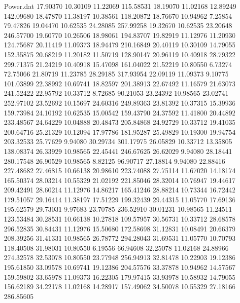 \begin{filecontents}{Power.dat}
  17.90370   10.30109   11.22069  115.58531
  18.19070   11.02168   12.89249  142.09680
  18.47870   11.38197   10.38561  118.20872
  18.76670   10.94962    7.25854   79.47826
  19.04470   10.62535   24.28085  257.99258
  19.32670   10.62535   23.20648  246.57700
  19.60770   10.26506   18.98061  194.83707
  19.82919   11.12976   11.20930  124.75687
  20.11419   11.09373   18.94479  210.16849
  20.40119   10.30109   14.79055  152.35875
  20.68219   11.20182   11.50719  128.90147
  20.96119   10.40918   28.79322  299.71375
  21.24219   10.40918   15.47098  161.04022
  21.52219   10.80550    6.73274   72.75066
  21.80719   11.23785   28.29185  317.93954
  22.09119   11.09373    9.10775  101.03899
  22.38992   10.69741   18.82597  201.38913
  22.67492   11.16579   21.63073  241.52422
  22.95792   10.33712    8.72685   90.21053
  23.24392   10.98565   23.02741  252.97102
  23.52692   10.15697   24.60316  249.89363
  23.81392   10.37315   15.39936  159.73984
  24.10192   10.62535   15.00542  159.43790
  24.37592   11.41800   20.44892  233.48567
  24.64229   10.04888   20.48473  205.84868
  24.92729   10.33712   19.41035  200.64716
  25.21329   10.12094   17.97786  181.95287
  25.49829   10.19300   19.94754  203.32533
  25.77629    9.94080   30.29734  301.17975
  26.05829   10.33712   13.35805  138.08374
  26.33929   10.98565   22.45441  246.67625
  26.62029    9.94080   28.18441  280.17548
  26.90529   10.98565    8.82125   96.90717
  27.18814    9.94080   22.88416  227.48682
  27.46815   10.66138   20.98610  223.74088
  27.75114   11.67020   14.18174  165.50374
  28.03214   10.55329   21.02192  221.85046
  28.32014   10.76947   19.44617  209.42491
  28.60214   11.12976   14.86217  165.41246
  28.88214   10.73344   16.72442  179.51057
  29.16414   11.38197   17.51229  199.32439
  29.44315   11.05770   17.69136  195.62579
  29.73031    9.97683   23.70785  236.52910
  30.01231   10.98565   11.24511  123.53484
  30.28531   10.66138   10.27818  109.57957
  30.56731   10.33712   28.68578  296.52835
  30.84431   11.12976   15.50680  172.58698
  31.12831   10.08491   20.66379  208.39256
  31.41331   10.98565   26.78772  294.28043
  31.69531   11.05770   10.70793  118.40508
  31.98031   10.80550    6.19556   66.94608
  32.25078   11.02168   24.88966  274.32578
  32.53078   10.80550   23.77948  256.94913
  32.81478   10.22903   19.12386  195.61850
  33.09578   10.69741   19.12386  204.57576
  33.37878   10.94962   14.57567  159.59802
  33.65978   11.09373   16.22305  179.97415
  33.93978   10.58932   14.79055  156.62189
  34.22178   11.02168   14.28917  157.49062
  34.50078   10.55329   27.18166  286.85605

\end{filecontents}
